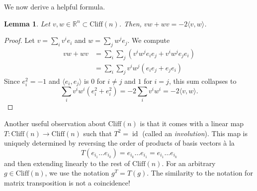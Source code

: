 \documentclass{article}
\newcommand{\R}{\mathbb{R}}
\newtheorem{lemma}{Lemma}[subsection]
\DeclareMathOperator{\id}{id}
\begin{document}
We now derive a helpful formula.

\vspace{0.5em}

\begin{lemma}
Let $v,w \in \R^n \subset \mathrm{Cliff}(n)$. Then, $vw + wv = -2\langle v,w \rangle$.
\end{lemma}

\vspace{0.5em}

\begin{proof}
Let $v = \sum_i v^ie_i$ and $w = \sum_j w^je_j$. We compute
\begin{align*}
vw + wv &= \sum_i \sum_j (v^iw^j e_ie_j + v^iw^je_je_i) \\
&= \sum_i\sum_j v^iw^j(e_ie_j + e_je_i) 
\end{align*}
Since $e_i^2 = -1$ and $\langle e_i, e_j \rangle$ is $0$ for $i \neq j$ and $1$ for $i = j$, this sum collapses to 
$$\sum_i v^iw^i(e_i^2 + e_i^2) = -2\sum_iv^iw^i  = -2\langle v,w \rangle.$$
\end{proof}

Another useful observation about $\mathrm{Cliff}(n)$ is that it comes with a linear map $T : \mathrm{Cliff}(n) \to \mathrm{Cliff}(n)$ such that $T^2 = \id$ (called an \textit{involution}). This map is uniquely determined by reversing the order of products of basis vectors \`{a} la
$$T(e_{i_1} \ldots e_{i_k}) = e_{i_k} \ldots e_{i_1} = e_{i_1} \ldots e_{i_k}$$
and then extending linearly to the rest of $\mathrm{Cliff}(n)$. For an arbitrary $g \in \mathrm{Cliff(n)}$, we use the notation $g^T = T(g)$. The similarity to the notation for matrix transposition is not a coincidence!
\end{document}
